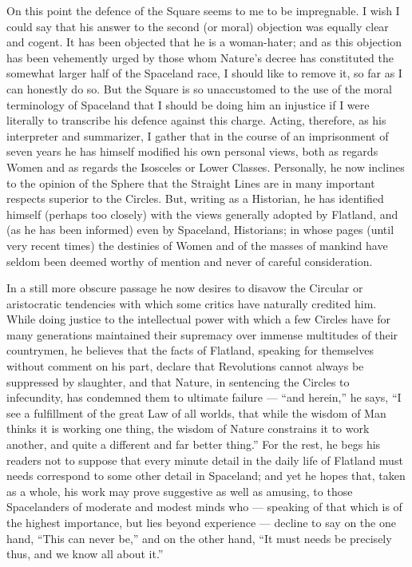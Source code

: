 \documentclass[10pt, kindle, oneside]{kindle}
\begin{document}
On this point the defence of the Square seems to me to be impregnable. I wish
I could say that his answer to the second (or moral) objection was equally
clear and cogent. It has been objected that he is a woman-hater; and as this
objection has been vehemently urged by those whom Nature's decree has
constituted the somewhat larger half of the Spaceland race, I should like to
remove it, so far as I can honestly do so. But the Square is so unaccustomed
to the use of the moral terminology of Spaceland that I should be doing him an
injustice if I were literally to transcribe his defence against this charge.
Acting, therefore, as his interpreter and summarizer, I gather that in the
course of an imprisonment of seven years he has himself modified his own
personal views, both as regards Women and as regards the Isosceles or Lower
Classes. Personally, he now inclines to the opinion of the Sphere  that the
Straight Lines are in many important respects superior to the
Circles. But, writing as a Historian, he has identified himself (perhaps too
closely) with the views generally adopted by Flatland, and (as he has been
informed) even by Spaceland, Historians; in whose pages (until very recent
times) the destinies of Women and of the masses of mankind have seldom been
deemed worthy of mention and never of careful consideration.

In a still more obscure passage he now desires to disavow the Circular or
aristocratic tendencies with which some critics have naturally credited him.
While doing justice to the intellectual power with which a few Circles have
for many generations maintained their supremacy over immense multitudes of
their countrymen, he believes that the facts of Flatland, speaking for
themselves without comment on his part, declare that Revolutions cannot always
be suppressed by slaughter, and that Nature, in sentencing the Circles to
infecundity, has condemned them to ultimate failure --- ``and herein,'' he says,
``I see a fulfillment of the great Law of all worlds, that while the wisdom of
Man thinks it is working one thing, the wisdom of Nature constrains it to work
another, and quite a different and far better thing.'' For the rest, he begs
his readers not to suppose that every minute detail in the daily life of
Flatland must needs correspond to some other detail in Spaceland; and yet he
hopes that, taken as a whole, his work may prove suggestive as well as
amusing, to those Spacelanders of moderate and modest minds who --- speaking of
that which is of the highest importance, but lies beyond experience --- decline
to say on the one hand, ``This can never be,'' and on the other hand, ``It must
needs be precisely thus, and we know all about it.''
\end{document}
